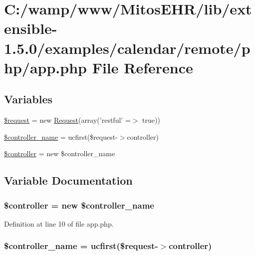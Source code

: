 \hypertarget{app_8php}{\section{\-C\-:/wamp/www/\-Mitos\-E\-H\-R/lib/extensible-\/1.5.0/examples/calendar/remote/php/app.php \-File \-Reference}
\label{app_8php}
}
\subsection*{\-Variables}
\begin{DoxyCompactItemize}
\item 
\hyperlink{app_8php_abb35c8495a232b510389fa6d7b15d38a}{\$request} = new \hyperlink{class_request}{\-Request}(array('restful' =$>$ true))
\item 
\hyperlink{app_8php_a32fb234388fd809a9aa672e5ae7d376a}{\$controller\-\_\-name} = ucfirst(\$request-\/$>$controller)
\item 
\hyperlink{app_8php_a388ef7b1db5e6f728e63cee704ce6e23}{\$controller} = new \$controller\-\_\-name
\end{DoxyCompactItemize}


\subsection{\-Variable \-Documentation}
\hypertarget{app_8php_a388ef7b1db5e6f728e63cee704ce6e23}{
\subsubsection[{\$controller}]{\setlength{\rightskip}{0pt plus 5cm}\$controller = new \$controller\-\_\-name}}\label{app_8php_a388ef7b1db5e6f728e63cee704ce6e23}


\-Definition at line 10 of file app.\-php.

\hypertarget{app_8php_a32fb234388fd809a9aa672e5ae7d376a}{
\subsubsection[{\$controller\-\_\-name}]{\setlength{\rightskip}{0pt plus 5cm}\$controller\-\_\-name = ucfirst(\$request-\/$>$controller)}}\label{app_8php_a32fb234388fd809a9aa672e5ae7d376a}


